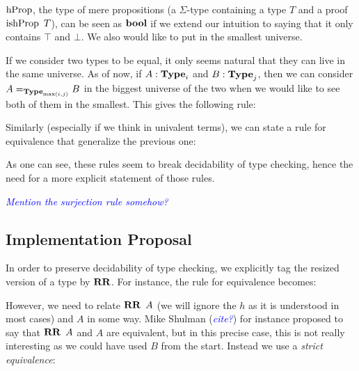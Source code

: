 \documentclass[11pt]{article}
\theoremstyle{plain}
\theoremstyle{remark}
\newcommand\meta[1]{\noindent\textcolor{blue}{\emph{#1}}}
\begin{document}
$\operatorname{hProp}$, the type of mere propositions (a $\Sigma$-type containing a type $T$
and a proof $\operatorname{ishProp}\ T$), can be seen as $\operatorname{\mathbf{bool}}$ if we extend our intuition
to saying that it only contains $\top$ and $\bot$. We also would like to put in
the smallest universe.

\begin{mathc}
\end{mathc}

If we consider two types to be equal, it only seems natural that they can live
in the same universe. As of now, if $A : \operatorname{\mathbf{Type}}_i$ and $B : \operatorname{\mathbf{Type}}_j$, then we
can consider $A =_{\operatorname{\mathbf{Type}}_{\max(i,j)}} B$ in the biggest universe of the two
when we would like to see both of them in the smallest.
This gives the following rule:

\begin{mathc}
\end{mathc}

Similarly (especially if we think in univalent terms), we can state a rule for
equivalence that generalize the previous one:

\begin{mathc}
\end{mathc}

As one can see, these rules seem to break decidability of type checking, hence
the need for a more explicit statement of those rules.

\meta{Mention the surjection rule somehow?}

\subsection{Implementation Proposal}

In order to preserve decidability of type checking, we explicitly tag the
resized version of a type by $\operatorname{\mathbf{RR}}$. For instance, the rule for equivalence
becomes:

\begin{mathc}
\end{mathc}

\noindent
However, we need to relate $\operatorname{\mathbf{RR}}\ A$ (we will ignore the $h$ as it is understood
in most cases) and $A$ in some way. Mike Shulman (\meta{cite?}) for instance
proposed to say that $\operatorname{\mathbf{RR}}\ A$ and $A$ are equivalent, but in this precise case,
this is not really interesting as we could have used $B$ from the start.
Instead we use a \emph{strict equivalence}:
\end{document}
